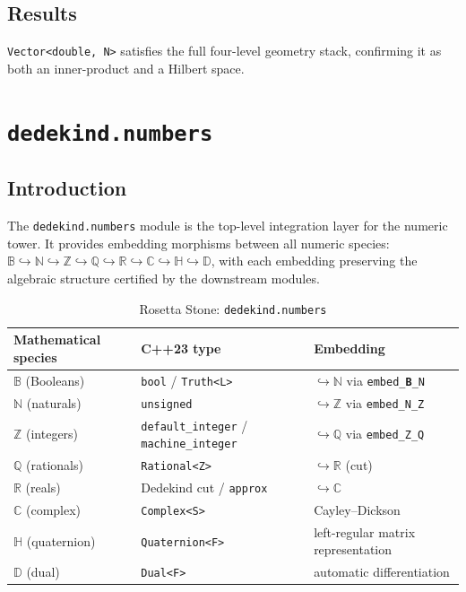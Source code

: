 \documentclass[11pt, a4paper]{report}
\begin{document}
\section{Results}

\texttt{Vector<double, N>} satisfies the full four-level geometry stack, confirming it as both an inner-product and a Hilbert space.


\chapter{\texttt{dedekind.numbers}}
\label{chap:numbers}

\section{Introduction}

The \texttt{dedekind.numbers} module is the top-level integration layer for the numeric tower.
It provides embedding morphisms between all numeric species:
$\mathbb{B} \hookrightarrow \mathbb{N} \hookrightarrow \mathbb{Z} \hookrightarrow \mathbb{Q} \hookrightarrow \mathbb{R} \hookrightarrow \mathbb{C} \hookrightarrow \mathbb{H} \hookrightarrow \mathbb{D}$,
with each embedding preserving the algebraic structure certified by the downstream modules.

\begin{table}[ht]
\centering
\caption{Rosetta Stone: \texttt{dedekind.numbers}}
\label{table:numbers}
\begin{tabular}{lll}
\toprule
\textbf{Mathematical species} & \textbf{C++23 type} & \textbf{Embedding} \\
\midrule
$\mathbb{B}$ (Booleans) & \texttt{bool} / \texttt{Truth<L>} & $\hookrightarrow \mathbb{N}$ via \texttt{embed\_\textbf{B}\_N} \\
$\mathbb{N}$ (naturals) & \texttt{unsigned} & $\hookrightarrow \mathbb{Z}$ via \texttt{embed\_N\_Z} \\
$\mathbb{Z}$ (integers) & \texttt{default\_integer} / \texttt{machine\_integer} & $\hookrightarrow \mathbb{Q}$ via \texttt{embed\_Z\_Q} \\
$\mathbb{Q}$ (rationals) & \texttt{Rational<Z>} & $\hookrightarrow \mathbb{R}$ (cut) \\
$\mathbb{R}$ (reals) & Dedekind cut / \texttt{approx} & $\hookrightarrow \mathbb{C}$ \\
$\mathbb{C}$ (complex) & \texttt{Complex<S>} & Cayley--Dickson \\
$\mathbb{H}$ (quaternion) & \texttt{Quaternion<F>} & left-regular matrix representation \\
$\mathbb{D}$ (dual) & \texttt{Dual<F>} & automatic differentiation \\
\bottomrule
\end{tabular}
\end{table}
\end{document}
